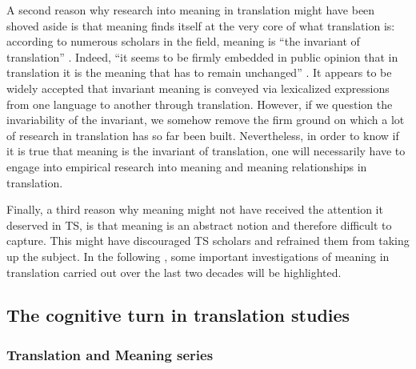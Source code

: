 A second reason why research into meaning in translation might have been shoved aside is that meaning finds itself at the very core of what translation is: according to numerous scholars in the field, meaning is “the invariant of translation” \citep[82]{lewandowska-tomasczyk_specification_2010}. Indeed, “it seems to be firmly embedded in public opinion that in translation it is the meaning that has to remain unchanged” \citep[82]{lewandowska-tomasczyk_specification_2010}. It appears to be widely accepted that invariant meaning is conveyed via lexicalized expressions from one language to another through translation. However, if we question the invariability of the invariant, we somehow remove the firm ground on which a lot of research in translation has so far been built. Nevertheless, in order to know if it is true that meaning is the invariant of translation, one will necessarily have to engage into empirical research into meaning and meaning relationships in translation.



Finally, a third reason why meaning might not have received the attention it deserved in TS, is that meaning is an abstract notion and therefore difficult to capture. This might have discouraged TS scholars and refrained them from taking up the subject. In the following , some important investigations of meaning in translation carried out over the last two decades will be highlighted.


\subsection{\label{sec:2.2.3}  The cognitive turn in translation studies}
\subsubsection{\label{sec:2.2.3.1}  Translation and Meaning series}

